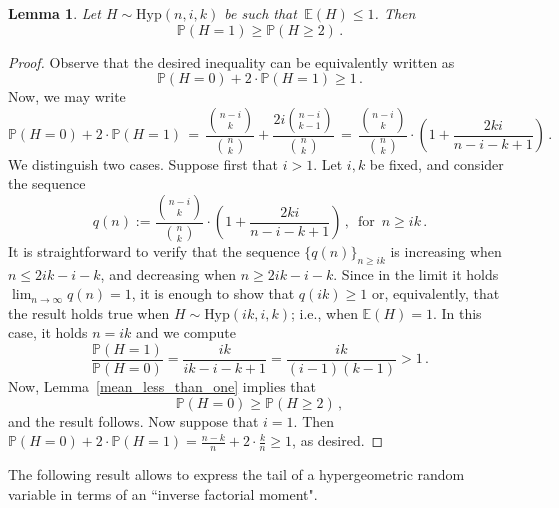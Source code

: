 \documentclass[10pt]{article}
\theoremstyle{plain}
\newtheorem{lemma}[theorem]{Lemma}
\theoremstyle{definition}
\theoremstyle{remark}
\newcommand{\Prb}{\mathbb{P}}
\newcommand{\Exp}{\mathbb{E}}
\begin{document}
\begin{lemma}\label{mean_less_than_one2}
Let $H\sim\text{Hyp}(n,i,k)$ be such that\, $\Exp(H)\le 1$. 
Then 
\[
\mathbb{P}(H=1) \ge \mathbb{P}(H\ge 2) \, .
\]
\end{lemma}
\begin{proof}
Observe that the desired inequality can be equivalently written as 
\[
\mathbb{P}(H=0) + 2\cdot\mathbb{P}(H=1)\ge 1 \, .
\]
Now, we may write 
\[
\mathbb{P}(H=0) + 2\cdot\mathbb{P}(H=1) \,=\, \frac{\binom{n-i}{k}}{\binom{n}{k}} + \frac{2i\binom{n-i}{k-1}}{\binom{n}{k}} 
\,=\,  \frac{\binom{n-i}{k}}{\binom{n}{k}}\cdot\left(1+ \frac{2ki}{n-i-k+1}\right)\, .
\]
We distinguish two cases. Suppose first that $i>1$. 
Let $i,k$ be fixed, and consider the sequence 
\[
q(n) := \frac{\binom{n-i}{k}}{\binom{n}{k}}\cdot\left(1+ \frac{2ki}{n-i-k+1}\right)\, ,\, \text{ for } \, n \ge ik \, .
\]
It is straightforward to verify  that the sequence $\{q(n)\}_{n\ge ik}$ 
is increasing when $n\le 2ik-i-k$,  
and  decreasing when $n\ge 2ik-i-k$. 
Since in the limit it holds $\lim_{n\to\infty}q(n)=1$, it is enough to show that $q(ik)\ge 1$ or, equivalently, that the result holds true when $H\sim\text{Hyp}(ik,i,k)$; i.e., when $\mathbb{E}(H)=1$. In this case, it holds $n=ik$ and we  compute  
\[
\frac{\mathbb{P}(H=1)}{\mathbb{P}(H=0)} = \frac{ik}{ik-i-k+1} =\frac{ik}{(i-1)(k-1)} > 1 \, .
\]
Now, Lemma~\ref{mean_less_than_one} implies that 
\[
\mathbb{P}(H=0) \ge \mathbb{P}(H\ge 2) \, ,
\]
and the result follows. 
Now suppose that $i=1$. Then 
$\Prb(H=0)+ 2\cdot\Prb(H=1) = \frac{n-k}{n} + 2\cdot \frac{k}{n} \ge 1$, 
as desired. 
\end{proof}

The following result allows to express the tail of a hypergeometric random variable in terms of  an ``inverse factorial moment". 
\end{document}
